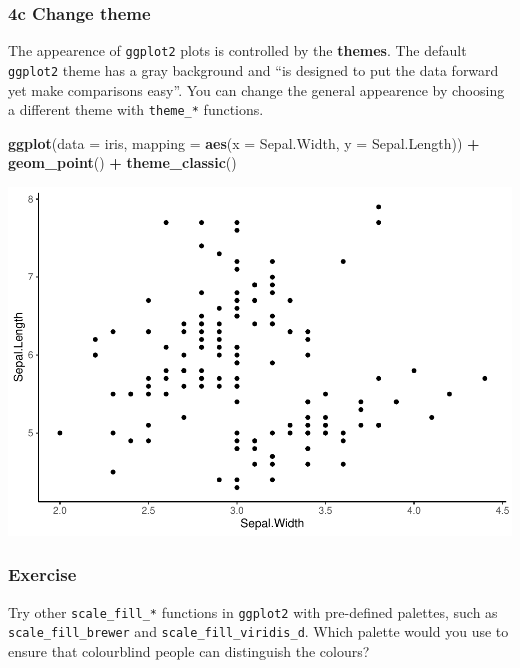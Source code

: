 \documentclass[
]{article}
\newenvironment{Shaded}{\begin{snugshade}}{\end{snugshade}}
\newcommand{\AttributeTok}[1]{\textcolor[rgb]{0.13,0.29,0.53}{#1}}
\newcommand{\FunctionTok}[1]{\textcolor[rgb]{0.13,0.29,0.53}{\textbf{#1}}}
\newcommand{\NormalTok}[1]{#1}
\newcommand{\SpecialCharTok}[1]{\textcolor[rgb]{0.81,0.36,0.00}{\textbf{#1}}}
\begin{document}
\subsubsection{\texorpdfstring{\textbf{4c} \textbar{} Change
theme}{4c \textbar{} Change theme}}\label{c-change-theme}

The appearence of \texttt{ggplot2} plots is controlled by the
\textbf{themes}. The default \texttt{ggplot2} theme has a gray
background and ``is designed to put the data forward yet make
comparisons easy''. You can change the general appearence by choosing a
different theme with \texttt{theme\_*} functions.

\begin{Shaded}
\begin{Highlighting}[]
\FunctionTok{ggplot}\NormalTok{(}\AttributeTok{data =}\NormalTok{ iris, }\AttributeTok{mapping =} \FunctionTok{aes}\NormalTok{(}\AttributeTok{x =}\NormalTok{ Sepal.Width, }\AttributeTok{y =}\NormalTok{ Sepal.Length)) }\SpecialCharTok{+}
  \FunctionTok{geom\_point}\NormalTok{() }\SpecialCharTok{+}
  \FunctionTok{theme\_classic}\NormalTok{()}
\end{Highlighting}
\end{Shaded}

\includegraphics{P1_exercises_files/figure-latex/theme-1.pdf}

\subsubsection{\texorpdfstring{ Exercise}{ Exercise}}\label{exercise-3}

Try other \texttt{scale\_fill\_*} functions in \texttt{ggplot2} with
pre-defined palettes, such as \texttt{scale\_fill\_brewer} and
\texttt{scale\_fill\_viridis\_d}. Which palette would you use to ensure
that colourblind people can distinguish the colours?
\end{document}
